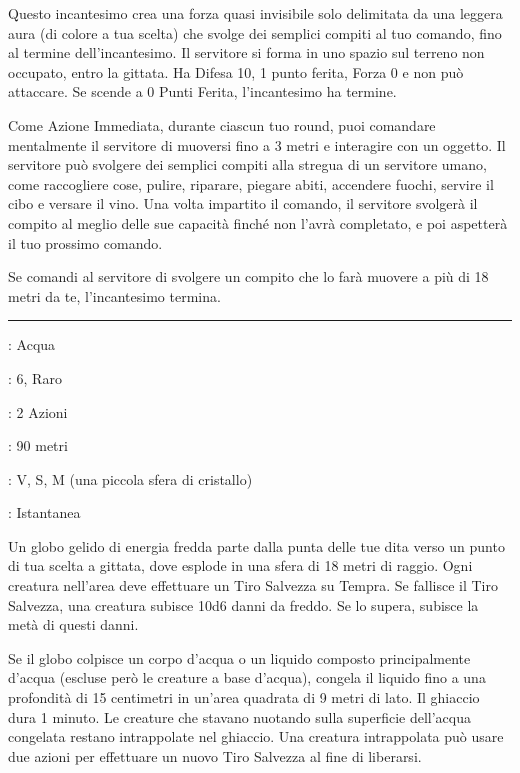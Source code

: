 \begin{multicols}{2}
Questo incantesimo crea una forza quasi invisibile solo delimitata da una leggera aura (di colore a tua scelta) che svolge dei semplici compiti al tuo comando, fino al termine dell'incantesimo. Il servitore si forma in uno spazio sul terreno non occupato, entro la gittata. Ha Difesa 10, 1 punto ferita, Forza 0 e non può attaccare. Se scende a 0 Punti Ferita, l'incantesimo ha termine.

Come Azione Immediata, durante ciascun tuo round, puoi comandare mentalmente il servitore di muoversi fino a 3 metri e interagire con un oggetto. Il servitore può svolgere dei semplici compiti alla stregua di un servitore umano, come raccogliere cose, pulire, riparare, piegare abiti, accendere fuochi, servire il cibo e versare il vino. Una volta impartito il comando, il servitore svolgerà il compito al meglio delle sue capacità finché non l'avrà completato, e poi aspetterà il tuo prossimo comando.

Se comandi al servitore di svolgere un compito che lo farà muovere a più di 18 metri da te, l'incantesimo termina.

\smallskip\noindent\rule{\linewidth}{2pt} \hypertarget{Sfera Congelante}{}\medskip{}
\noindent
\begin{description}[noitemsep, topsep=0pt, parsep=0pt, partopsep=0pt, leftmargin=0cm, labelwidth=2.8cm]
	\item[\textbf{Lista di Magia}]: Acqua
	\item[\textbf{Livello}]: 6, Raro
	\item[\textbf{T. di Lancio}]: 2 Azioni
	\item[\textbf{Gittata}]: 90 metri
	\item[\textbf{Componenti}]: V, S, M (una piccola sfera di cristallo)
	\item[\textbf{Durata}]: Istantanea
\end{description}

Un globo gelido di energia fredda parte dalla punta delle tue dita verso un punto di tua scelta a gittata, dove esplode in una sfera di 18 metri di raggio. Ogni creatura nell'area deve effettuare un Tiro Salvezza su Tempra. Se fallisce il Tiro Salvezza, una creatura subisce 10d6 danni da freddo. Se lo supera, subisce la metà di questi danni.

Se il globo colpisce un corpo d'acqua o un liquido composto principalmente d'acqua (escluse però le creature a base d'acqua), congela il liquido fino a una profondità di 15 centimetri in un'area quadrata di 9 metri di lato. Il ghiaccio dura 1 minuto. Le creature che stavano nuotando sulla superficie dell'acqua congelata restano intrappolate nel ghiaccio. Una creatura intrappolata può usare due azioni per effettuare un nuovo Tiro Salvezza al fine di liberarsi.


\end{multicols}
